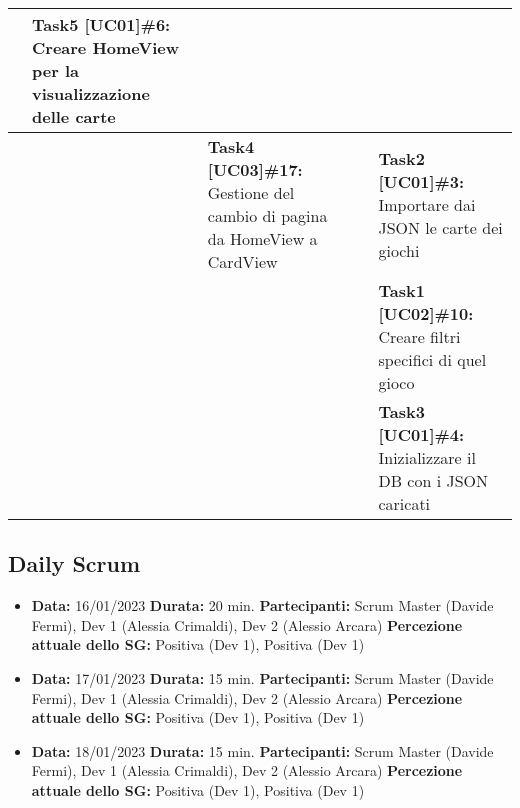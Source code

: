 \documentclass{article}
\begin{document}
\begin{itemize}
\begin{tabular}{ | p{2.4cm} | p{1.4cm} | p{2.7cm} | p{3.4cm} | p{3cm} | }
            & \textbf{Task5 [UC01]\#6:} Creare HomeView per la visualizzazione delle carte \\
            \hline
            & & \textbf{Task4 [UC03]\#17:} Gestione del cambio di pagina da HomeView a CardView
            & & \textbf{Task2 [UC01]\#3:} Importare dai JSON le carte dei giochi \\
            \hline
            & & & & \textbf{Task1 [UC02]\#10:} Creare filtri specifici di quel gioco  \\
            \hline
            & & & & \textbf{Task3 [UC01]\#4:} Inizializzare il DB con i JSON caricati \\
            \hline
        \end{tabular}
    \end{itemize}

    \subsection{Daily Scrum}
    \begin{itemize}
        \item \textbf{Data:} 16/01/2023
        \newline \textbf{Durata:} 20 min.
        \newline \textbf{Partecipanti:} Scrum Master (Davide Fermi), Dev 1 (Alessia Crimaldi), Dev 2 (Alessio Arcara)
        \newline \textbf{Percezione attuale dello SG:} Positiva (Dev 1), Positiva (Dev 1)
    \end{itemize}
    \begin{itemize}
        \item \textbf{Data:} 17/01/2023
        \newline \textbf{Durata:} 15 min.
        \newline \textbf{Partecipanti:} Scrum Master (Davide Fermi), Dev 1 (Alessia Crimaldi), Dev 2 (Alessio Arcara)
        \newline \textbf{Percezione attuale dello SG:} Positiva (Dev 1), Positiva (Dev 1)
    \end{itemize}
    \begin{itemize}
        \item \textbf{Data:} 18/01/2023
        \newline \textbf{Durata:} 15 min.
        \newline \textbf{Partecipanti:} Scrum Master (Davide Fermi), Dev 1 (Alessia Crimaldi), Dev 2 (Alessio Arcara)
        \newline \textbf{Percezione attuale dello SG:} Positiva (Dev 1), Positiva (Dev 1)
    \end{itemize}
\end{document}
